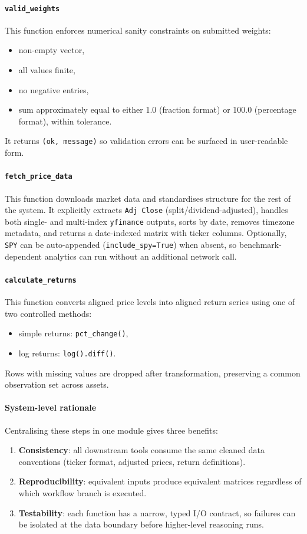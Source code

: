 \paragraph{\texttt{valid\_weights}}
This function enforces numerical sanity constraints on submitted weights:
\begin{itemize}
    \item non-empty vector,
    \item all values finite,
    \item no negative entries,
    \item sum approximately equal to either 1.0 (fraction format) or 100.0 (percentage format), within tolerance.
\end{itemize}
It returns \texttt{(ok, message)} so validation errors can be surfaced in user-readable form.

\paragraph{\texttt{fetch\_price\_data}}
This function downloads market data and standardises structure for the rest of the system. It explicitly extracts \texttt{Adj Close} (split/dividend-adjusted), handles both single- and multi-index \texttt{yfinance} outputs, sorts by date, removes timezone metadata, and returns a date-indexed matrix with ticker columns. Optionally, \texttt{SPY} can be auto-appended (\texttt{include\_spy=True}) when absent, so benchmark-dependent analytics can run without an additional network call.

\paragraph{\texttt{calculate\_returns}}
This function converts aligned price levels into aligned return series using one of two controlled methods:
\begin{itemize}
    \item simple returns: \texttt{pct\_change()},
    \item log returns: \texttt{log().diff()}.
\end{itemize}
Rows with missing values are dropped after transformation, preserving a common observation set across assets.

\paragraph{System-level rationale}
Centralising these steps in one module gives three benefits:
\begin{enumerate}
    \item \textbf{Consistency}: all downstream tools consume the same cleaned data conventions (ticker format, adjusted prices, return definitions).
    \item \textbf{Reproducibility}: equivalent inputs produce equivalent matrices regardless of which workflow branch is executed.
    \item \textbf{Testability}: each function has a narrow, typed I/O contract, so failures can be isolated at the data boundary before higher-level reasoning runs.
\end{enumerate}


